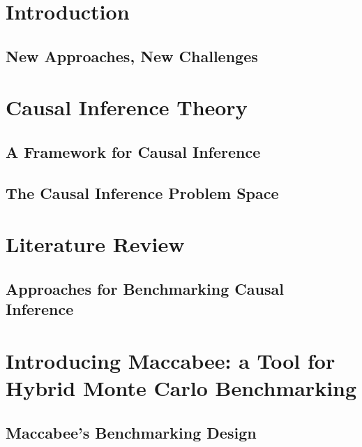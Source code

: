 \documentclass[oneside, fleqn]{book}
\begin{document}
 
\frontmatter


\clearpage
\thispagestyle{empty}

\tableofcontents
 
\mainmatter
\part{Introduction}

\chapter{New Approaches, New Challenges}



\part{Causal Inference Theory}

\chapter{A Framework for Causal Inference} \label{chap:framework}


\chapter{The Causal Inference Problem Space}
\label{chap:problemspace}



\part{Literature Review}
\chapter{Approaches for Benchmarking Causal Inference}
\label{chap:litreview}

 
\part{Introducing Maccabee: a Tool for Hybrid Monte Carlo Benchmarking}
\chapter{Maccabee's Benchmarking Design}
\label{chap:macdesign}

\end{document}
